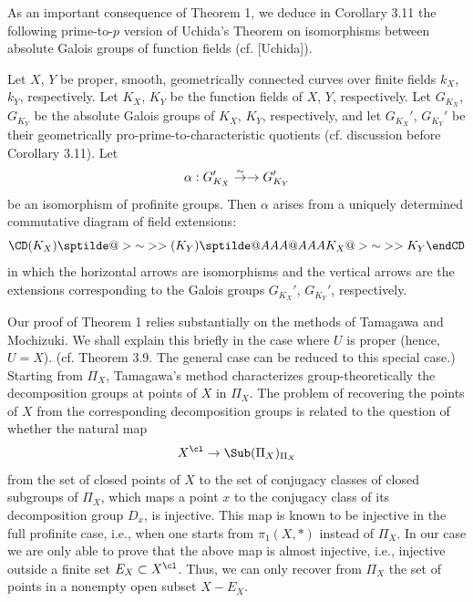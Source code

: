 As an important consequence of Theorem 1, %
we deduce in Corollary 3.11 
the following prime-to-$p$ version of Uchida's Theorem on isomorphisms 
between absolute Galois groups of function fields (cf. [Uchida]).


 Let $X$, $Y$ be proper, smooth, geometrically connected 
curves over finite fields $k_X$, $k_Y$, respectively. 
Let $K_X$, $K_Y$ be the function fields of $X$, $Y$, respectively. Let $G_{K_{X}}$,
$G_{K_{Y}}$ be the absolute Galois groups of $K_X$, $K_Y$, respectively, 
and let $G_{K_{X}}'$, 
$G_{K_{Y}}'$ be their geometrically pro-prime-to-characteristic quotients 
(cf. discussion before Corollary 3.11). Let 
$$\alpha : G_{K_{X}}'\overset \sim \to \rightarrow G_{K_{Y}}'$$
be an isomorphism of profinite groups. Then $\alpha$ arises from a uniquely 
determined commutative diagram of field extensions:
$$
\CD
(K_X)\sptilde @>{\sim}>> (K_Y)\sptilde \\
@AAA              @AAA \\
K_{X} @>{\sim}>> K_{Y} \\
\endCD
$$
in which the horizontal arrows are isomorphisms and the vertical arrows are the 
extensions corresponding to the Galois groups $G_{K_{X}}'$,  $G_{K_{Y}}'$, respectively. 
\endproclaim

Our proof of Theorem 1 relies substantially on the methods 
of Tamagawa and Mochizuki. 
We shall explain this briefly in the case where 
$U$ is proper (hence, $U=X$). (cf. Theorem 3.9. 
The general case can be reduced to this special case.) 
Starting from $\Pi _X$,  Tamagawa's method characterizes group-theoretically
the decomposition groups at points of $X$
in $\Pi _X$. The problem of recovering the points of $X$ from the corresponding decomposition 
groups is related to the question of whether the natural map
$$X^{\cl}\to \Sub (\Pi_X)_{\Pi_{X}} %
$$from the set of closed points of $X$ 
to the set of conjugacy classes of closed subgroups of $\Pi_X$,
which maps a point $x$ to the conjugacy class of its decomposition group 
$D_x$,
is injective. This map is known to be injective in the 
full profinite case, i.e., when one 
starts from $\pi_1(X,*)$ instead of $\Pi_X$. In our case 
we are only able to prove that the 
above map is almost injective, 
i.e., injective outside a finite set $E_X\subset X^{\cl}$. 
Thus, we can only recover from $\Pi _X$ the set of points in a nonempty open subset 
$X-E_X$. 

